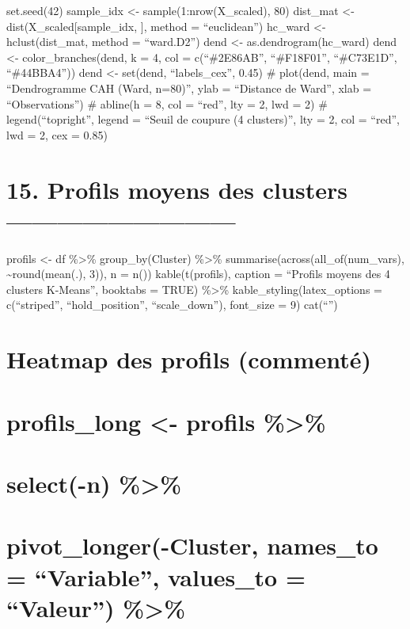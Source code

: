 \documentclass[
]{article}
\begin{document}
set.seed(42) sample\_idx \textless- sample(1:nrow(X\_scaled), 80)
dist\_mat \textless- dist(X\_scaled{[}sample\_idx, {]}, method =
``euclidean'') hc\_ward \textless- hclust(dist\_mat, method =
``ward.D2'') dend \textless- as.dendrogram(hc\_ward) dend \textless-
color\_branches(dend, k = 4, col = c(``\#2E86AB'', ``\#F18F01'',
``\#C73E1D'', ``\#44BBA4'')) dend \textless- set(dend, ``labels\_cex'',
0.45) \# plot(dend, main = ``Dendrogramme CAH (Ward, n=80)'', ylab =
``Distance de Ward'', xlab = ``Observations'') \# abline(h = 8, col =
``red'', lty = 2, lwd = 2) \# legend(``topright'', legend = ``Seuil de
coupure (4 clusters)'', lty = 2, col = ``red'', lwd = 2, cex = 0.85)

\section{15. Profils moyens des clusters
---------------------------}\label{profils-moyens-des-clusters}

profils \textless- df \%\textgreater\% group\_by(Cluster)
\%\textgreater\% summarise(across(all\_of(num\_vars),
\textasciitilde round(mean(.), 3)), n = n()) kable(t(profils), caption =
``Profils moyens des 4 clusters K-Means'', booktabs = TRUE)
\%\textgreater\% kable\_styling(latex\_options = c(``striped'',
``hold\_position'', ``scale\_down''), font\_size = 9) cat(``\n'')

\section{Heatmap des profils
(commenté)}\label{heatmap-des-profils-commentuxe9}

\section{profils\_long \textless- profils
\%\textgreater\%}\label{profils_long---profils}

\section{select(-n) \%\textgreater\%}\label{select-n}

\section{pivot\_longer(-Cluster, names\_to = ``Variable'', values\_to =
``Valeur'')
\%\textgreater\%}\label{pivot_longer-cluster-names_to-variable-values_to-valeur}
\end{document}
